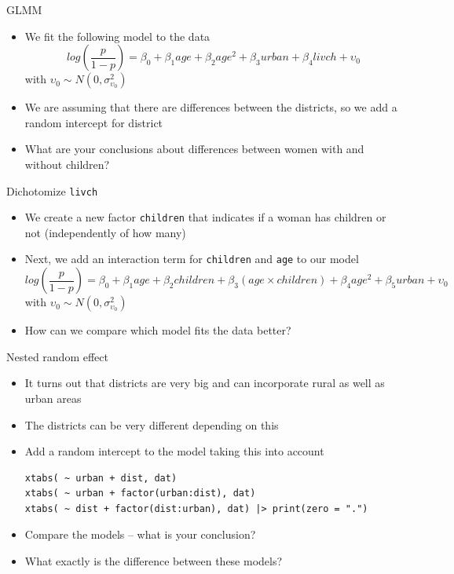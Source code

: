 \documentclass[aspectratio=169]{beamer}
\begin{document}
\begin{frame}{GLMM}
  \begin{itemize}
    \item We fit the following model to the data
      \[
        log\left(\frac{p}{1-p}\right) = \beta_0 + \beta_1 age + \beta_2 age^2 + \beta_3
        urban + \beta_4 livch + \upsilon_0
      \]
      with $\upsilon_0 \sim N(0, \sigma_{\upsilon_0}^2)$
    \item We are assuming that there are differences between the districts, so
      we add a random intercept for district
    \item What are your conclusions about differences between women with and
      without children?
  \end{itemize}
\end{frame}

\begin{frame}{Dichotomize \texttt{livch}}
  \begin{itemize}
    \item We create a new factor \texttt{children} that indicates if a woman has
      children or not (independently of how many)
    \item Next, we add an interaction term for \texttt{children} and
      \texttt{age} to our model
      \[
        log(\frac{p}{1-p}) = \beta_0 + \beta_1 age + \beta_2 children + \beta_3
        (age \times children) + \beta_4 age^2 + \beta_5 urban + \upsilon_0
      \]
      with $\upsilon_0 \sim N(0, \sigma_{\upsilon_0}^2)$
    \item How can we compare which model fits the data better?
  \end{itemize}
\end{frame}

\begin{frame}[fragile]{Nested random effect}
  \begin{itemize}
    \item It turns out that districts are very big and can incorporate rural as
      well as urban areas
    \item The districts can be very different depending on this
    \item Add a random intercept to the model taking this into account
\begin{lstlisting}
xtabs( ~ urban + dist, dat)
xtabs( ~ urban + factor(urban:dist), dat)
xtabs( ~ dist + factor(dist:urban), dat) |> print(zero = ".")
\end{lstlisting}
    \item Compare the models -- what is your conclusion?
    \item What exactly is the difference between these models?
  \end{itemize}
\end{frame}
\end{document}
